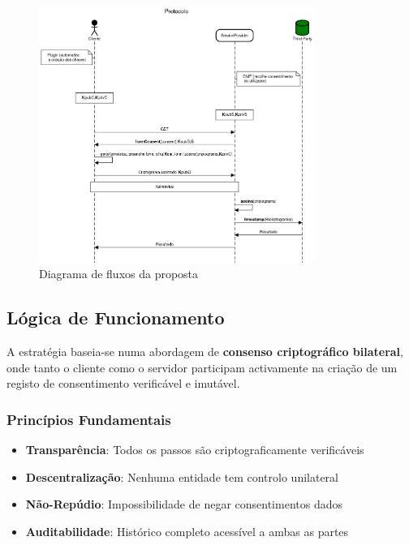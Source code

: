 \begin{figure}[h]
\begin{center}
\includegraphics[width=0.8\textwidth]{images/Protocolo.png}
\end{center}
\caption{Diagrama de fluxos da proposta}
\label{fig:esquema}
\end{figure}

\subsection{Lógica de Funcionamento}

A estratégia baseia-se numa abordagem de \textbf{consenso criptográfico bilateral}, onde tanto o cliente como o servidor participam activamente na criação de um registo de consentimento verificável e imutável.

\subsubsection{Princípios Fundamentais}
\begin{itemize}
    \item \textbf{Transparência}: Todos os passos são criptograficamente verificáveis
    \item \textbf{Descentralização}: Nenhuma entidade tem controlo unilateral
    \item \textbf{Não-Repúdio}: Impossibilidade de negar consentimentos dados
    \item \textbf{Auditabilidade}: Histórico completo acessível a ambas as partes
\end{itemize}

